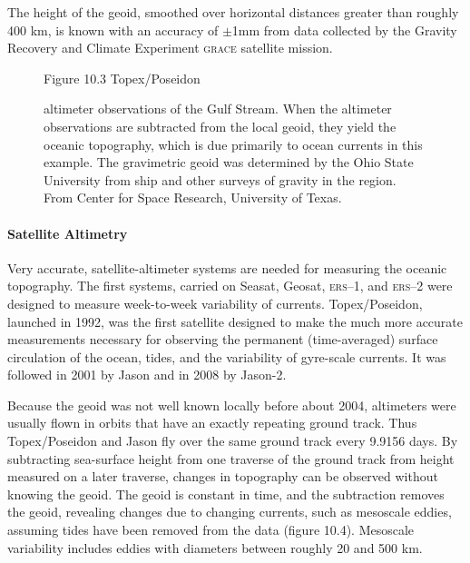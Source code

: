 The height of the geoid, smoothed over horizontal distances greater than roughly 400 km, is known with an accuracy of $\pm$1mm from data collected by the Gravity Recovery and Climate Experiment \textsc{grace} satellite mission. 

\begin{figure}[t!]
\footnotesize
Figure 10.3 Topex/Poseidon
\rule{0mm}{3ex}altimeter observations of the Gulf Stream. When the altimeter observations
are subtracted from the local geoid, they yield the oceanic topography, which is due primarily
to ocean currents in this example. The gravimetric geoid was determined by the Ohio State
University from ship and other surveys of gravity in the region. From Center for Space
Research, University of Texas.
\label{sshprofile}
\vspace{-5ex}
\end{figure}

\paragraph{Satellite Altimetry}
Very accurate, satellite-altimeter systems are needed for
measuring the oceanic topography. The first systems, carried on Seasat, Geosat,
\textsc{ers}--1, and \textsc{ers}--2 were designed to measure
week-to-week variability of currents. Topex/Poseidon, launched in 1992,
was the first satellite designed to make the much more accurate measurements necessary for
observing the permanent (time-averaged) surface circulation of the ocean, tides, and the
variability of gyre-scale currents. It was followed in 2001 by Jason and in 2008 by Jason-2.

Because the geoid was not well known locally before about 2004, altimeters were usually flown in orbits that have an exactly repeating ground track. Thus Topex/Poseidon and Jason fly over the same ground track every 9.9156 days. By subtracting
sea-surface height from one traverse of the ground track from height measured on a later
traverse, changes in topography can be observed without knowing the geoid. The
geoid is constant in time, and the subtraction removes the geoid, revealing changes
due to changing currents, such as mesoscale eddies, assuming tides
have been removed from the data (figure 10.4). Mesoscale variability includes eddies with
diameters between roughly 20 and 500 km.

